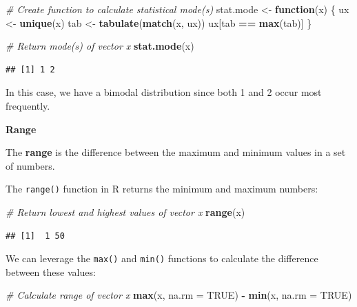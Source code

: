 \documentclass[]{book}
\newenvironment{Shaded}{\begin{snugshade}}{\end{snugshade}}
\newcommand{\CommentTok}[1]{\textcolor[rgb]{0.56,0.35,0.01}{\textit{#1}}}
\newcommand{\ControlFlowTok}[1]{\textcolor[rgb]{0.13,0.29,0.53}{\textbf{#1}}}
\newcommand{\DataTypeTok}[1]{\textcolor[rgb]{0.13,0.29,0.53}{#1}}
\newcommand{\KeywordTok}[1]{\textcolor[rgb]{0.13,0.29,0.53}{\textbf{#1}}}
\newcommand{\NormalTok}[1]{#1}
\newcommand{\OperatorTok}[1]{\textcolor[rgb]{0.81,0.36,0.00}{\textbf{#1}}}
\newcommand{\OtherTok}[1]{\textcolor[rgb]{0.56,0.35,0.01}{#1}}
\newcommand{\StringTok}[1]{\textcolor[rgb]{0.31,0.60,0.02}{#1}}
\begin{document}
\begin{Shaded}
\begin{Highlighting}[]
\CommentTok{# Create function to calculate statistical mode(s)}
\NormalTok{stat.mode <-}\StringTok{ }\ControlFlowTok{function}\NormalTok{(x) \{}
\NormalTok{  ux <-}\StringTok{ }\KeywordTok{unique}\NormalTok{(x)}
\NormalTok{  tab <-}\StringTok{ }\KeywordTok{tabulate}\NormalTok{(}\KeywordTok{match}\NormalTok{(x, ux))}
\NormalTok{  ux[tab }\OperatorTok{==}\StringTok{ }\KeywordTok{max}\NormalTok{(tab)]}
\NormalTok{\}}

\CommentTok{# Return mode(s) of vector x}
\KeywordTok{stat.mode}\NormalTok{(x)}
\end{Highlighting}
\end{Shaded}

\begin{verbatim}
## [1] 1 2
\end{verbatim}

In this case, we have a bimodal distribution since both 1 and 2 occur most frequently.

\textbf{Range}

The \textbf{range} is the difference between the maximum and minimum values in a set of numbers.

The \texttt{range()} function in R returns the minimum and maximum numbers:

\begin{Shaded}
\begin{Highlighting}[]
\CommentTok{# Return lowest and highest values of vector x}
\KeywordTok{range}\NormalTok{(x)}
\end{Highlighting}
\end{Shaded}

\begin{verbatim}
## [1]  1 50
\end{verbatim}

We can leverage the \texttt{max()} and \texttt{min()} functions to calculate the difference between these values:

\begin{Shaded}
\begin{Highlighting}[]
\CommentTok{# Calculate range of vector x}
\KeywordTok{max}\NormalTok{(x, }\DataTypeTok{na.rm =} \OtherTok{TRUE}\NormalTok{) }\OperatorTok{-}\StringTok{ }\KeywordTok{min}\NormalTok{(x, }\DataTypeTok{na.rm =} \OtherTok{TRUE}\NormalTok{)}
\end{Highlighting}
\end{Shaded}
\end{document}
